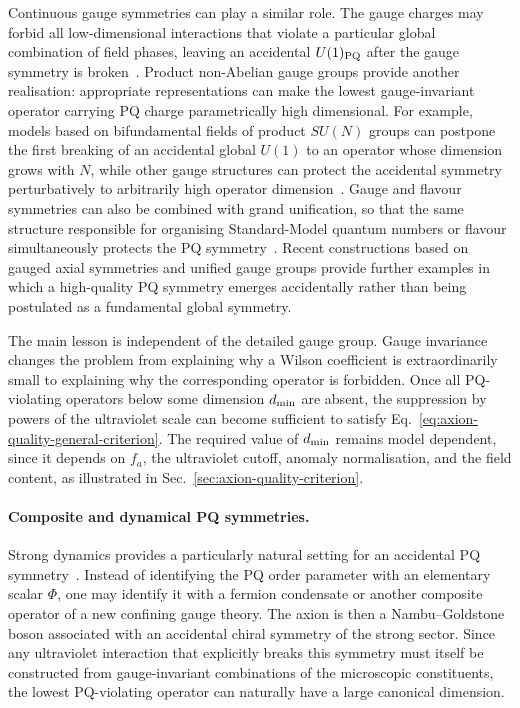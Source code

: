 \documentclass[review]{elsarticle}
\numberwithin{equation}{section}
\numberwithin{table}{section}
\numberwithin{figure}{section}
\begin{document}
Continuous gauge symmetries can play a similar role. The gauge charges may forbid all low-dimensional interactions that violate a particular global combination of field phases, leaving an accidental $U(1)_{\rm PQ}$ after the gauge symmetry is broken~\cite{Barr:1992qq,Fukuda:2017ylt,Qiu:2023los}. Product non-Abelian gauge groups provide another realisation: appropriate representations can make the lowest gauge-invariant operator carrying PQ charge parametrically high dimensional. For example, models based on bifundamental fields of product $SU(N)$ groups can postpone the first breaking of an accidental global $U(1)$ to an operator whose dimension grows with $N$, while other gauge structures can protect the accidental symmetry perturbatively to arbitrarily high operator dimension~\cite{Gavela:2018paw,Ardu:2020qmo}. Gauge and flavour symmetries can also be combined with grand unification, so that the same structure responsible for organising Standard-Model quantum numbers or flavour simultaneously protects the PQ symmetry~\cite{Georgi:1981pu,DiLuzio:2020qio,DiLuzio:2020xgc,DiLuzio:2025jhv}. Recent constructions based on gauged axial symmetries and unified gauge groups provide further examples in which a high-quality PQ symmetry emerges accidentally rather than being postulated as a fundamental global symmetry.

The main lesson is independent of the detailed gauge group. Gauge invariance changes the problem from explaining why a Wilson coefficient is extraordinarily small to explaining why the corresponding operator is forbidden. Once all PQ-violating operators below some dimension $d_{\rm min}$ are absent, the suppression by powers of the ultraviolet scale can become sufficient to satisfy Eq.~\eqref{eq:axion-quality-general-criterion}. The required value of $d_{\rm min}$ remains model dependent, since it depends on $f_a$, the ultraviolet cutoff, anomaly normalisation, and the field content, as illustrated in Sec.~\ref{sec:axion-quality-criterion}.

\paragraph{Composite and dynamical PQ symmetries.}

Strong dynamics provides a particularly natural setting for an accidental PQ symmetry~\cite{Kim:1984pt,Choi:1985cb,Randall:1992ut,Redi:2016esr}. Instead of identifying the PQ order parameter with an elementary scalar $\Phi$, one may identify it with a fermion condensate or another composite operator of a new confining gauge theory. The axion is then a Nambu--Goldstone boson associated with an accidental chiral symmetry of the strong sector. Since any ultraviolet interaction that explicitly breaks this symmetry must itself be constructed from gauge-invariant combinations of the microscopic constituents, the lowest PQ-violating operator can naturally have a large canonical dimension.
\end{document}
